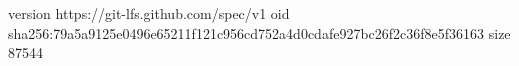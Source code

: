 version https://git-lfs.github.com/spec/v1
oid sha256:79a5a9125e0496e65211f121c956cd752a4d0cdafe927bc26f2c36f8e5f36163
size 87544
